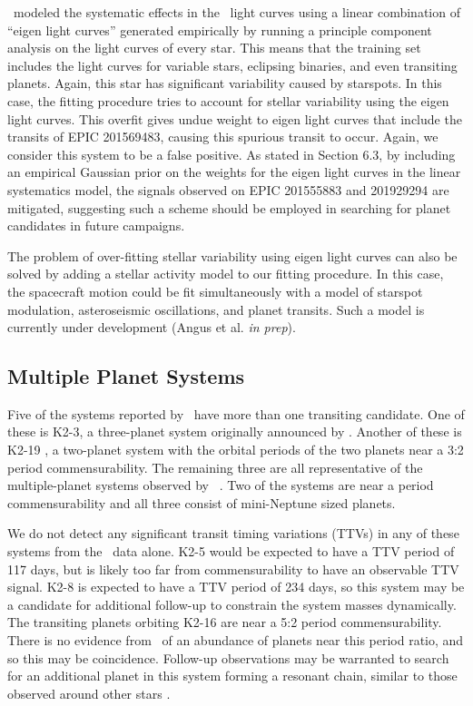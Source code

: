 \paperit\ modeled the systematic effects in the \KT\ light curves using a
linear combination of ``eigen light curves'' generated empirically by running
a principle component analysis on the light curves of every star.
This means that the training set includes the light curves for variable stars,
eclipsing binaries, and even transiting planets.
Again, this star has significant variability caused by starspots.
In this case, the fitting procedure tries to account for stellar variability using
the eigen light curves.
This overfit gives undue weight to eigen light curves that include the transits
of EPIC 201569483, causing this spurious transit to occur.
Again, we consider this system to be a false positive.
As stated in Section 6.3, by including an empirical Gaussian
prior on the weights for the eigen light curves in the linear systematics model,
the signals observed on EPIC 201555883 and 201929294 are mitigated, suggesting
such a scheme should be employed in searching for planet candidates in future
campaigns.

The problem of over-fitting stellar variability using eigen light curves can also be
solved by adding a stellar activity model to our fitting procedure.
In this case, the spacecraft motion could be fit simultaneously with a model
of starspot modulation, asteroseismic oscillations, and planet transits.
Such a model is currently under development (Angus et al. \textit{in prep}).


\subsection{Multiple Planet Systems}
Five of the systems reported by \paperit\ have more than one transiting
candidate.
One of these is K2-3, a three-planet system originally announced by
\citet{Crossfield15}.
Another of these is K2-19 \citep{Armstrong15b}, a two-planet system with the
orbital periods of the two planets near a 3:2 period commensurability.
The remaining three are all representative of the multiple-planet systems observed by
\kep\ \citep{Lissauer11b, Fabrycky14}.
Two of the systems are near a period commensurability and all three consist of
mini-Neptune sized planets.



We do not detect any significant transit timing variations (TTVs) in any of these systems from
the \KT\ data alone.
K2-5 would be expected to have a TTV period of 117 days, but
is likely too far from commensurability to have an observable TTV signal.
K2-8 is expected to have a TTV period of 234 days, so this system may be a candidate
for additional follow-up to constrain the system masses dynamically.
The transiting planets orbiting K2-16 are near a 5:2 period commensurability.
There is no evidence from \kep\ of an abundance of planets near this period ratio, and so this
may be coincidence.
Follow-up observations may be warranted to search for an additional planet in this system
forming a resonant chain, similar to those observed around other stars \citep[e.g.][]{Swift13,
Campante15}.

